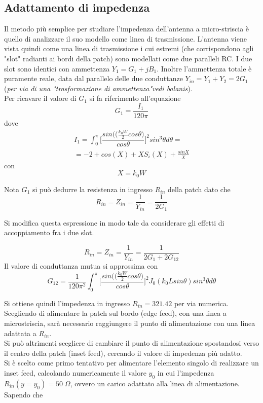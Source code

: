 \documentclass[twoside,twocolumn]{article}
\begin{document}
\subsection*{Adattamento di impedenza}
Il metodo più semplice per studiare l'impedenza dell'antenna a micro-striscia è quello di analizzare il suo modello come linea di trasmissione.
L'antenna viene vista quindi come una linea di trasmissione i cui estremi (che corrispondono agli "slot" radianti ai bordi della patch) sono modellati come  due paralleli RC.
I due slot sono identici con ammettenza $Y_{1}=G_{1}+jB_{1}$. Inoltre l'ammettenza totale è puramente reale, data dal parallelo delle due conduttanze  $Y_{in}=Y_{1}+Y_{2}=2G_{1}$ (\textit{per via di una "trasformazione di ammettenza"vedi balanis}).\\
Per ricavare il valore di $G_{1}$ si fa riferimento all'equazione 
\begin{equation}
G_{1}= \frac{I_{1}}{120\pi}
\end{equation}
dove 
\begin{align*}
I_{1}= \int_0^\pi \Big[\dfrac{sin (\big( \frac{k_{0}W}{2} cos\theta\big)}{cos\theta}\Big]^2 sin^3\theta d\theta = \\
=-2+cos(X)+XS_{i}(X)+\frac{sinX}{X}
\end{align*}
con 
\begin{equation}
X=k_{0}W
\end{equation}

Nota $G_{1}$ si può dedurre la resistenza in ingresso $R_{in}$ della patch dato che 
\begin{equation}
R_{in}=Z_{in}= \frac{1}{Y_{in}}=\frac{1}{2G_{1}}
\end{equation}

Si modifica questa espressione in modo tale da considerare gli effetti di accoppiamento fra i due slot.

\begin{equation}
R_{in}=Z_{in}= \frac{1}{Y_{in}}=\frac{1}{2G_{1}+2G_{12}}
\end{equation}
Il valore di conduttanza mutua si approssima con 
\begin{equation}
G_{12}= \frac{1}{120\pi^2}\int_0^\pi \Big[\dfrac{sin (\big( \frac{k_{0}W}{2} cos\theta\big)}{cos\theta}\Big]^2 J_{0}(k_{0}Lsin\theta)sin^3\theta d\theta
\end{equation}

Si ottiene quindi l'impedenza in ingresso $R_{in}= 321.42$ per via numerica.
Scegliendo di alimentare la patch sul bordo (edge feed), con una linea a microstriscia, sarà necessario raggiungere il punto di alimentazione con una linea adattata a $R_{in}$.\\
Si può altrimenti scegliere di cambiare il punto di alimentazione spostandosi verso il centro della patch (inset feed), cercando il valore di impedenza più adatto.\\
Si è scelto come primo tentativo per alimentare l'elemento singolo di realizzare un inset feed, calcolando numericamente il valore $y_{0}$ in cui l'impedenza $R_{in}(y=y_{0})= 50 \; \Omega$, ovvero un carico adattato alla linea di alimentazione.
Sapendo che 
\end{document}
